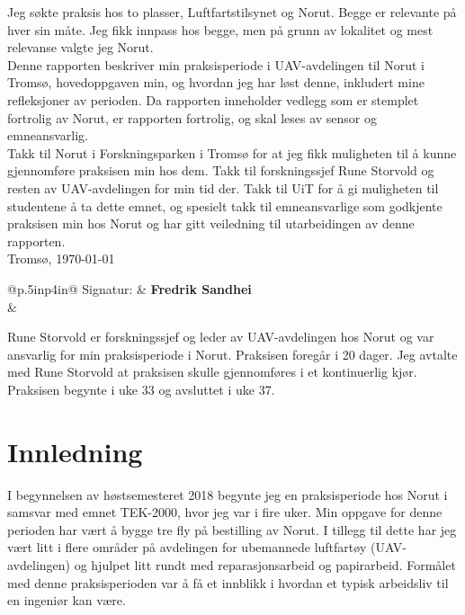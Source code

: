 \documentclass[12pt, a4paper]{article}
\begin{document}
Jeg søkte praksis hos to plasser, Luftfartstilsynet og Norut. Begge er relevante på hver sin måte. Jeg fikk innpass hos begge, men på grunn av lokalitet og mest relevanse valgte jeg Norut.\\


Denne rapporten beskriver min praksisperiode i UAV-avdelingen til Norut i Tromsø, hovedoppgaven min, og hvordan jeg har løst denne, inkludert mine refleksjoner av perioden. Da rapporten inneholder vedlegg som er stemplet fortrolig av Norut, er rapporten fortrolig, og skal leses av sensor og emneansvarlig. \\ 

Takk til Norut i Forskningsparken i Tromsø for at jeg fikk muligheten til å kunne gjennomføre praksisen min hos dem. Takk til forskningssjef Rune Storvold og resten av UAV-avdelingen for min tid der. Takk til UiT for å gi muligheten til studentene å ta dette emnet, og spesielt takk til emneansvarlige som godkjente praksisen min hos Norut og har gitt veiledning til utarbeidingen av denne rapporten. \\[7cm]
Tromsø, \today \\[.5cm]

\begin{flushleft}
	\begin{tabular}{@{}p{.5in}p{4in}@{}}
	Signatur: & \hspace{.5cm}\textbf{Fredrik Sandhei} \\
			  & \hrulefill \\
	\end{tabular}

\end{flushleft}
\clearpage

Rune Storvold er forskningssjef og leder av UAV-avdelingen hos Norut og var ansvarlig for min praksisperiode i Norut. Praksisen foregår i 20 dager. Jeg avtalte med Rune Storvold at praksisen skulle gjennomføres i et kontinuerlig kjør. Praksisen begynte i uke 33 og avsluttet i uke 37.\\


\begin{minipage}[b]{1\linewidth}
	\tableofcontents
	\vspace{.5cm}
\end{minipage}
\begin{minipage}[b]{1\linewidth}
	\listoffigures
\end{minipage}
\clearpage

\section{Innledning}
I begynnelsen av høstsemesteret 2018 begynte jeg en praksisperiode hos Norut i samsvar med emnet TEK-2000, hvor jeg var i fire uker. Min oppgave for denne perioden har vært å bygge tre fly på bestilling av Norut. I tillegg til dette har jeg vært litt i flere områder på avdelingen for ubemannede luftfartøy (UAV-avdelingen) og hjulpet litt rundt med reparasjonsarbeid og papirarbeid. Formålet med denne praksisperioden var å få et innblikk i hvordan et typisk arbeidsliv til en ingeniør kan være. \\
\end{document}

